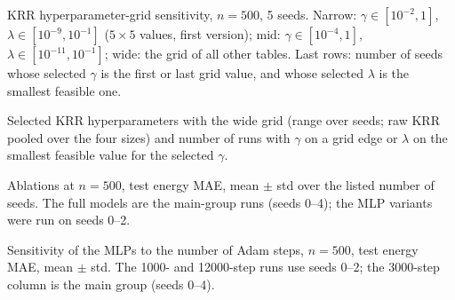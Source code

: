 \begin{table}[t]\centering\caption{KRR hyperparameter-grid sensitivity, $n{=}500$, 5 seeds. Narrow: $\gamma\in[10^{-2},1]$, $\lambda\in[10^{-9},10^{-1}]$ ($5\times5$ values, first version); mid: $\gamma\in[10^{-4},1]$, $\lambda\in[10^{-11},10^{-1}]$; wide: the grid of all other tables. Last rows: number of seeds whose selected $\gamma$ is the first or last grid value, and whose selected $\lambda$ is the smallest feasible one.}\label{tab:grid}
\footnotesize\setlength{\tabcolsep}{3pt}\resizebox{\ifdim\width>\columnwidth\columnwidth\else\width\fi}{!}{}\end{table}
\begin{table}[t]\centering\caption{Selected KRR hyperparameters with the wide grid (range over seeds; raw KRR pooled over the four sizes) and number of runs with $\gamma$ on a grid edge or $\lambda$ on the smallest feasible value for the selected $\gamma$.}\label{tab:hp}
\footnotesize\setlength{\tabcolsep}{3pt}\resizebox{\ifdim\width>\columnwidth\columnwidth\else\width\fi}{!}{}\end{table}
\begin{table}[t]\centering\caption{Ablations at $n{=}500$, test energy MAE, mean $\pm$ std over the listed number of seeds. The full models are the main-group runs (seeds 0--4); the MLP variants were run on seeds 0--2.}\label{tab:abl}
\footnotesize\setlength{\tabcolsep}{3pt}\resizebox{\ifdim\width>\columnwidth\columnwidth\else\width\fi}{!}{}\end{table}
\begin{table}[t]\centering\caption{Sensitivity of the MLPs to the number of Adam steps, $n{=}500$, test energy MAE, mean $\pm$ std. The 1000- and 12000-step runs use seeds 0--2; the 3000-step column is the main group (seeds 0--4).}\label{tab:steps}
\footnotesize\setlength{\tabcolsep}{3pt}\resizebox{\ifdim\width>\columnwidth\columnwidth\else\width\fi}{!}{}\end{table}
